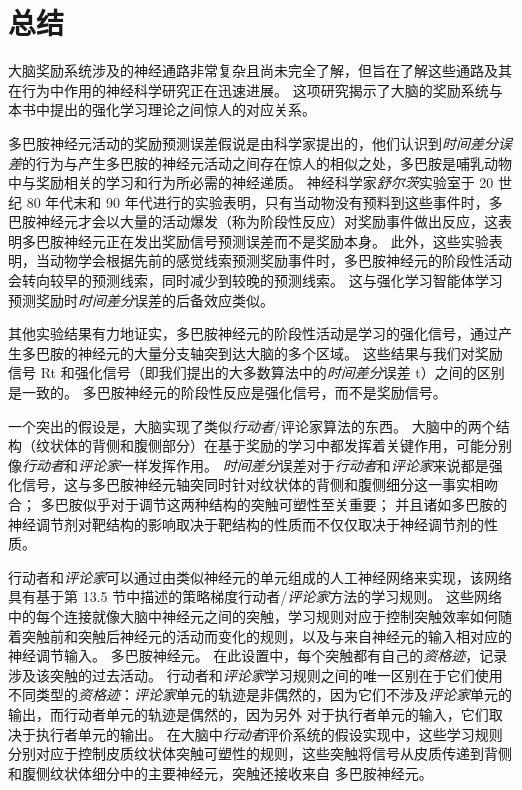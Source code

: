 \section{总结}

大脑奖励系统涉及的神经通路非常复杂且尚未完全了解，但旨在了解这些通路及其在行为中作用的神经科学研究正在迅速进展。
这项研究揭示了大脑的奖励系统与本书中提出的强化学习理论之间惊人的对应关系。


多巴胺神经元活动的奖励预测误差假说是由科学家提出的，他们认识到\textit{时间差分误差}的行为与产生多巴胺的神经元活动之间存在惊人的相似之处，多巴胺是哺乳动物中与奖励相关的学习和行为所必需的神经递质。
神经科学家\textit{舒尔茨}实验室于 20 世纪 80 年代末和 90 年代进行的实验表明，只有当动物没有预料到这些事件时，多巴胺神经元才会以大量的活动爆发（称为阶段性反应）对奖励事件做出反应，这表明多巴胺神经元正在发出奖励信号预测误差而不是奖励本身。
此外，这些实验表明，当动物学会根据先前的感觉线索预测奖励事件时，多巴胺神经元的阶段性活动会转向较早的预测线索，同时减少到较晚的预测线索。
这与强化学习智能体学习预测奖励时\textit{时间差分}误差的后备效应类似。


其他实验结果有力地证实，多巴胺神经元的阶段性活动是学习的强化信号，通过产生多巴胺的神经元的大量分支轴突到达大脑的多个区域。
这些结果与我们对奖励信号 Rt 和强化信号（即我们提出的大多数算法中的\textit{时间差分}误差 t）之间的区别是一致的。
多巴胺神经元的阶段性反应是强化信号，而不是奖励信号。


一个突出的假设是，大脑实现了类似\textit{行动者}/评论家算法的东西。
大脑中的两个结构（纹状体的背侧和腹侧部分）在基于奖励的学习中都发挥着关键作用，可能分别像\textit{行动者}和\textit{评论家}一样发挥作用。
\textit{时间差分}误差对于\textit{行动者}和\textit{评论家}来说都是强化信号，这与多巴胺神经元轴突同时针对纹状体的背侧和腹侧细分这一事实相吻合；
多巴胺似乎对于调节这两种结构的突触可塑性至关重要；
并且诸如多巴胺的神经调节剂对靶结构的影响取决于靶结构的性质而不仅仅取决于神经调节剂的性质。


行动者和\textit{评论家}可以通过由类似神经元的单元组成的人工神经网络来实现，该网络具有基于第 13.5 节中描述的策略梯度行动者/\textit{评论家}方法的学习规则。
这些网络中的每个连接就像大脑中神经元之间的突触，学习规则对应于控制突触效率如何随着突触前和突触后神经元的活动而变化的规则，以及与来自神经元的输入相对应的神经调节输入。
多巴胺神经元。
在此设置中，每个突触都有自己的\textit{资格迹}，记录涉及该突触的过去活动。
行动者和\textit{评论家}学习规则之间的唯一区别在于它们使用不同类型的\textit{资格迹}：\textit{评论家}单元的轨迹是非偶然的，因为它们不涉及\textit{评论家}单元的输出，而行动者单元的轨迹是偶然的，因为另外 对于执行者单元的输入，它们取决于执行者单元的输出。
在大脑中\textit{行动者}评价系统的假设实现中，这些学习规则分别对应于控制皮质纹状体突触可塑性的规则，这些突触将信号从皮质传递到背侧和腹侧纹状体细分中的主要神经元，突触还接收来自 多巴胺神经元。


